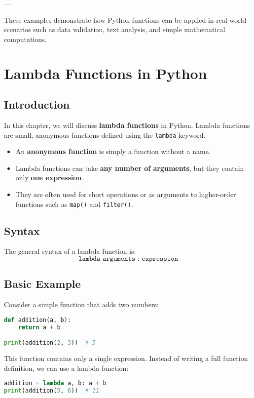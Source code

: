 ---

These examples demonstrate how Python functions can be applied in real-world scenarios such as data validation, text analysis, and simple mathematical computations.

\chapter{Lambda Functions in Python}

\section{Introduction}
In this chapter, we will discuss \textbf{lambda functions} in Python.  
Lambda functions are small, anonymous functions defined using the \texttt{lambda} keyword.  

\begin{itemize}
    \item An \textbf{anonymous function} is simply a function without a name.
    \item Lambda functions can take \textbf{any number of arguments}, but they contain only \textbf{one expression}.
    \item They are often used for short operations or as arguments to higher-order functions such as \texttt{map()} and \texttt{filter()}.
\end{itemize}

\section{Syntax}
The general syntax of a lambda function is:
\[
\texttt{lambda arguments : expression}
\]

\section{Basic Example}
Consider a simple function that adds two numbers:
\begin{lstlisting}[language=Python, caption={Standard function for addition}]
def addition(a, b):
    return a + b

print(addition(2, 3))  # 5
\end{lstlisting}

This function contains only a single expression. Instead of writing a full function definition, we can use a lambda function:

\begin{lstlisting}[language=Python, caption={Addition using lambda}]
addition = lambda a, b: a + b
print(addition(5, 6))  # 11
\end{lstlisting}


